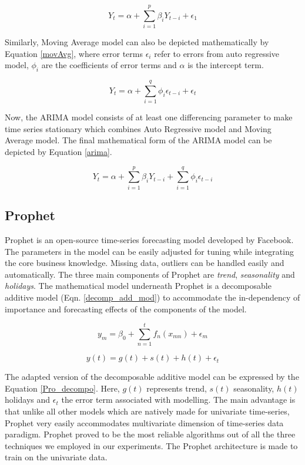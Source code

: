\documentclass[times,twocolumn,final,authoryear]{elsarticle}
\begin{document}
	\begin{equation}
		\label{autoRegr}
		Y_t = \alpha + \sum_{i = 1}^{p}\beta_i Y_{t-i} + \epsilon_1
	\end{equation}
	
	Similarly, Moving Average model can also be depicted mathematically by Equation \ref{movAvg}, where error terms \(\epsilon_i\) refer to errors from auto regressive model, \(\phi_i\) are the coefficients of error terms and \(\alpha\) is the intercept term. 
	
	\begin{equation}
		\label{movAvg}
		Y_t = \alpha + \sum_{i = 1}^{q}\phi_i \epsilon_{t-i} + \epsilon_t
	\end{equation}
	
	Now, the ARIMA model consists of at least one differencing parameter to make time series stationary which combines Auto Regressive model and Moving Average model. The final mathematical form of the ARIMA model can be depicted by Equation \ref{arima}. 
	
	\begin{equation}
		\label{arima}
		Y_t = \alpha + \sum_{i = 1}^{p}\beta_i Y_{t-i} + \sum_{i = 1}^{q}\phi_i \epsilon_{t-i}
	\end{equation}
	
	\subsection{Prophet}
	Prophet \cite{Prophet} is an open-source time-series forecasting model developed by Facebook. The parameters in the model can be easily adjusted for tuning while integrating the core business knowledge. Missing data, outliers can be handled easily and automatically. The three main components of Prophet are \emph{trend}, \emph{seasonality} and \emph{holidays}. The mathematical model underneath Prophet is a decomposable additive model (Eqn. \ref{decomp_add_mod}) to accommodate the in-dependency of importance and forecasting effects of the components of the model.
	
	\begin{equation}
		\label{decomp_add_mod}
		y_m = \beta_0 + \sum_{n = 1}^{t}f_n(x_{mn}) + \epsilon_m
	\end{equation}    
	
	\begin{equation}
		\label{Pro_decompo}
		y(t) = g(t) + s(t) + h(t) + \epsilon_t
	\end{equation}
	
	The adapted version of the decomposable additive model can be expressed by the Equation \ref{Pro_decompo}. Here, \(g(t)\) represents trend, \(s(t)\) seasonality,  \(h(t)\) holidays and \(\epsilon_t\) the error term associated with modelling. The main advantage is that unlike all other models which are natively made for univariate time-series, Prophet very easily accommodates multivariate dimension of time-series data paradigm. Prophet proved to be the most reliable algorithms out of all the three techniques we employed in our experiments. The Prophet architecture is made to train on the univariate data.
	
\end{document}
